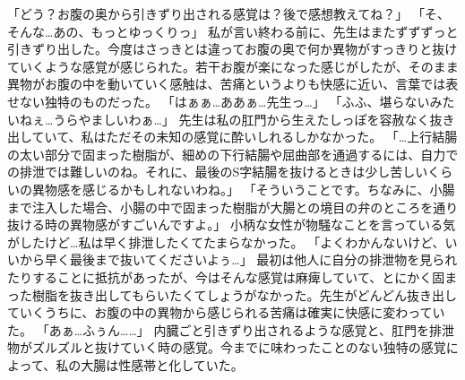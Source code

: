 「どう？お腹の奥から引きずり出される感覚は？後で感想教えてね？」
「そ、そんな…あの、もっとゆっくりっ」
私が言い終わる前に、先生はまたずずずっと引きずり出した。今度はさっきとは違ってお腹の奥で何か異物がすっきりと抜けていくような感覚が感じられた。若干お腹が楽になった感じがしたが、そのまま異物がお腹の中を動いていく感触は、苦痛というよりも快感に近い、言葉では表せない独特のものだった。
「はぁぁ…ああぁ…先生っ…」
「ふふ、堪らないみたいねぇ…うらやましいわぁ…」
先生は私の肛門から生えたしっぽを容赦なく抜き出していて、私はただその未知の感覚に酔いしれるしかなかった。
「…上行結腸の太い部分で固まった樹脂が、細めの下行結腸や屈曲部を通過するには、自力での排泄では難しいのね。それに、最後のS字結腸を抜けるときは少し苦しいくらいの異物感を感じるかもしれないわね。」
「そういうことです。ちなみに、小腸まで注入した場合、小腸の中で固まった樹脂が大腸との境目の弁のところを通り抜ける時の異物感がすごいんですよ。」
小柄な女性が物騒なことを言っている気がしたけど…私は早く排泄したくてたまらなかった。
「よくわかんないけど、いいから早く最後まで抜いてくださいよぅ…」
最初は他人に自分の排泄物を見られたりすることに抵抗があったが、今はそんな感覚は麻痺していて、とにかく固まった樹脂を抜き出してもらいたくてしょうがなかった。先生がどんどん抜き出していくうちに、お腹の中の異物から感じられる苦痛は確実に快感に変わっていた。
「あぁ…ふぅん……」
内臓ごと引きずり出されるような感覚と、肛門を排泄物がズルズルと抜けていく時の感覚。今までに味わったことのない独特の感覚によって、私の大腸は性感帯と化していた。


